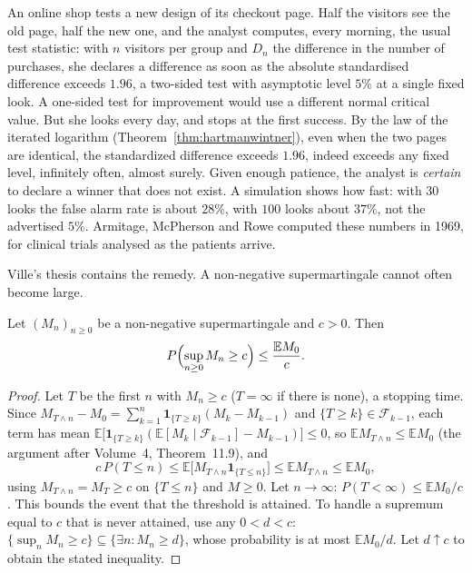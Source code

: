 An online shop tests a new design of its checkout page. Half the visitors see the old page, half the new one, and the analyst computes, every morning, the usual test statistic: with $n$ visitors per
group and $D_n$ the difference in the number of purchases, she declares a difference as soon as the absolute standardised difference exceeds $1.96$, a two-sided test with asymptotic level $5\%$ at a single fixed look. A one-sided test for improvement would use a different normal critical value.
But she looks every day, and stops at the first success. By the law of the iterated logarithm (Theorem~\ref{thm:hartmanwintner}), even when the two pages are identical, the standardized difference exceeds
$1.96$, indeed exceeds any fixed level, infinitely often, almost surely. Given enough patience, the analyst is \emph{certain} to declare a winner that does not exist. A simulation shows how fast: with $30$ looks the
false alarm rate is about $28\%$, with $100$ looks about $37\%$, not the advertised $5\%$. Armitage, McPherson and Rowe computed
these numbers in 1969, for clinical trials analysed as the patients arrive.

Ville's thesis contains the remedy. A non-negative supermartingale cannot often become large.

\begin{theorem}\label{thm:ville}
Let $(M_n)_{n\ge0}$ be a non-negative supermartingale and $c>0$. Then
\[
P\Bigl(\sup_{n\ge0}M_n\ge c\Bigr)\le\frac{\mathbb EM_0}c.
\]
\end{theorem}
\begin{proof}
Let $T$ be the first $n$ with $M_n\ge c$ ($T=\infty$ if there is none), a stopping time. Since $M_{T\wedge n}-M_0=\sum_{k=1}^n\mathbf 1_{\{T\ge k\}}(M_k-M_{k-1})$ and
$\{T\ge k\}\in\mathcal F_{k-1}$, each term has mean $\mathbb E\bigl[\mathbf 1_{\{T\ge k\}}(\mathbb E[M_k\mid\mathcal F_{k-1}]-M_{k-1})\bigr]\le0$, so $\mathbb EM_{T\wedge n}\le\mathbb EM_0$ (the argument after Volume~4, Theorem~11.9), and
\[
c\,P(T\le n)\le\mathbb E\bigl[M_{T\wedge n}\mathbf 1_{\{T\le n\}}\bigr]\le\mathbb EM_{T\wedge n}\le\mathbb EM_0,
\]
using $M_{T\wedge n}=M_T\ge c$ on $\{T\le n\}$ and $M\ge0$. Let $n\to\infty$: $P(T<\infty)\le\mathbb EM_0/c$. This bounds the event that the threshold is attained. To handle a supremum equal to $c$ that is never attained, use any $0<d<c$: $\{\sup_nM_n\ge c\}\subseteq\{\exists n:M_n\ge d\}$, whose probability is at most $\mathbb EM_0/d$. Let $d\uparrow c$ to obtain the stated inequality.
\end{proof}

